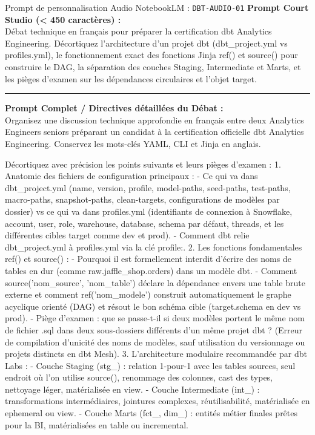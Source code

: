 \documentclass[11pt,a4paper]{article}
\begin{document}
\begin{promptbox}{Prompt de personnalisation Audio NotebookLM : \texttt{DBT-AUDIO-01}}
\textbf{Prompt Court Studio (< 450 caractères) :}\\
Débat technique en français pour préparer la certification dbt Analytics Engineering. Décortiquez l'architecture d'un projet dbt (dbt\_project.yml vs profiles.yml), le fonctionnement exact des fonctions Jinja ref() et source() pour construire le DAG, la séparation des couches Staging, Intermediate et Marts, et les pièges d'examen sur les dépendances circulaires et l'objet target.

\medskip\hrule\medskip
\textbf{Prompt Complet / Directives détaillées du Débat :}\\
Organisez une discussion technique approfondie en français entre deux Analytics Engineers seniors préparant un candidat à la certification officielle dbt Analytics Engineering. Conservez les mots-clés YAML, CLI et Jinja en anglais.

Décortiquez avec précision les points suivants et leurs pièges d'examen :
1. Anatomie des fichiers de configuration principaux :
- Ce qui va dans dbt\_project.yml (name, version, profile, model-paths, seed-paths, test-paths, macro-paths, snapshot-paths, clean-targets, configurations de modèles par dossier) vs ce qui va dans profiles.yml (identifiants de connexion à Snowflake, account, user, role, warehouse, database, schema par défaut, threads, et les différentes cibles target comme dev et prod).
- Comment dbt relie dbt\_project.yml à profiles.yml via la clé profile:.
2. Les fonctions fondamentales ref() et source() :
- Pourquoi il est formellement interdit d'écrire des noms de tables en dur (comme raw.jaffle\_shop.orders) dans un modèle dbt.
- Comment source('nom\_source', 'nom\_table') déclare la dépendance envers une table brute externe et comment ref('nom\_modele') construit automatiquement le graphe acyclique orienté (DAG) et résout le bon schéma cible (target.schema en dev vs prod).
- Piège d'examen : que se passe-t-il si deux modèles portent le même nom de fichier .sql dans deux sous-dossiers différents d'un même projet dbt ? (Erreur de compilation d'unicité des noms de modèles, sauf utilisation du versionnage ou projets distincts en dbt Mesh).
3. L'architecture modulaire recommandée par dbt Labs :
- Couche Staging (stg\_) : relation 1-pour-1 avec les tables sources, seul endroit où l'on utilise source(), renommage des colonnes, cast des types, nettoyage léger, matérialisée en view.
- Couche Intermediate (int\_) : transformations intermédiaires, jointures complexes, réutilisabilité, matérialisée en ephemeral ou view.
- Couche Marts (fct\_, dim\_) : entités métier finales prêtes pour la BI, matérialisées en table ou incremental.
\end{promptbox}
\end{document}
